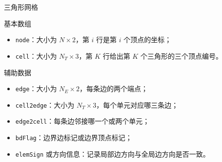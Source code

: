\documentclass[aspectratio=169,professionalfonts]{ctexbeamer}
\begin{document}
\begin{frame}{三角形网格}
\begin{block}{基本数组}
\begin{itemize}
  \item \texttt{node}：大小为 $N\times 2$，第 $i$ 行是第 $i$ 个顶点的坐标；
  \item \texttt{cell}：大小为 $N_T\times 3$，第 $K$ 行给出第 $K$ 个三角形的三个顶点编号。
\end{itemize}
\end{block}

\begin{block}{辅助数据}
\begin{itemize}
  \item \texttt{edge}：大小为 $N_E\times 2$，每条边的两个端点；
  \item \texttt{cell2edge}：大小为 $N_T\times 3$，每个单元对应哪三条边；
  \item \texttt{edge2cell}：每条边邻接哪一个或两个单元；
  \item \texttt{bdFlag}：边界边标记或边界顶点标记；
  \item \texttt{elemSign} 或方向信息：记录局部边方向与全局边方向是否一致。
\end{itemize}
\end{block}

\end{frame}
\end{document}
